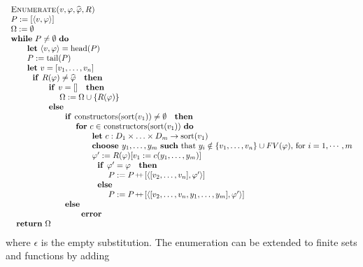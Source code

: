 \documentclass{article}
\providecommand{\concat}{\ensuremath{\hspace{0.12em}\raisebox{0.2ex}{\text{\scriptsize+}\!\text{\scriptsize+}}\hspace{0.12em}}}
\begin{document}
\bigskip 
\[
\begin{tabular}{l}
\textsc{Enumerate(}$v,\varphi ,\widehat{\varphi },R$\textsc{)} \\ 
$P:=[\left\langle v,\varphi \right\rangle ]$ \\ 
$\Omega :=\emptyset $ \\ 
\textbf{while} $P\neq \emptyset $ \textbf{do} \\ 
\qquad \textbf{let} $\left\langle v,\varphi \right\rangle =\mathrm{head}(P)$
\\ 
\qquad $P:=\mathrm{tail}(P)$ \\ 
\qquad \textbf{let} $v=[v_{1},\ldots ,v_{n}]$ \\ 
\qquad $\text{\textbf{if }}R(\varphi )\neq \widehat{\varphi }\text{ \textbf{%
then}}$ \\ 
\qquad \qquad $\text{\textbf{if }}v=[]\text{ \textbf{then}}$ \\ 
\qquad \qquad \qquad $\Omega :=\Omega \cup \left\{ R(\varphi )\right\} $ \\ 
\qquad \qquad $\text{\textbf{else}}$ \\ 
\qquad \qquad \qquad $\text{\textbf{if }}\mathrm{constructors}(\mathrm{sort}%
(v_{1}))\neq \emptyset \text{ \textbf{then}}$ \\ 
\qquad \qquad \qquad \qquad \textbf{for} $c\in $ $\mathrm{constructors}(%
\mathrm{sort}(v_{1}))$ \textbf{do} \\ 
\qquad \qquad \qquad \qquad \qquad \textbf{let} $c:D_{1}\times \ldots \times
D_{m}\rightarrow \mathrm{sort}(v_{1})$ \\ 
\qquad \qquad \qquad \qquad \qquad \textbf{choose }$y_{1},\ldots ,y_{m}$ 
\textbf{such} that $y_{i}\notin \{v_{1},\ldots ,v_{n}\}\cup FV(\varphi )$,
for $i=1,\cdots ,m$ \\ 
\qquad \qquad \qquad \qquad \qquad $\varphi ^{\prime }:=R(\varphi
)[v_{1}:=c(y_{1},\ldots ,y_{m})]$ \\ 
\qquad \qquad \qquad \qquad \qquad $\text{\textbf{if }}\varphi ^{\prime
}=\varphi \text{ \textbf{then}}$ \\ 
\qquad \qquad \qquad \qquad \qquad \qquad $P:=P\concat\lbrack \left\langle
[v_{2},\ldots ,v_{n}],\varphi ^{\prime }\right\rangle ]$ \\ 
\qquad \qquad \qquad \qquad \qquad $\text{\textbf{else}}$ \\ 
\qquad \qquad \qquad \qquad \qquad \qquad $P:=P\concat\lbrack \left\langle
[v_{2},\ldots ,v_{n},y_{1},\ldots ,y_{m}],\varphi ^{\prime }\right\rangle ]$
\\ 
\qquad \qquad \qquad $\text{\textbf{else}}$ \\ 
\qquad \qquad \qquad \qquad $\text{\textbf{error}}$ \\ 
$\text{\textbf{return}}$ $\Omega $%
\end{tabular}%
\]%
where $\epsilon $ is the empty substitution. The enumeration can be extended
to finite sets and functions by adding
\end{document}
